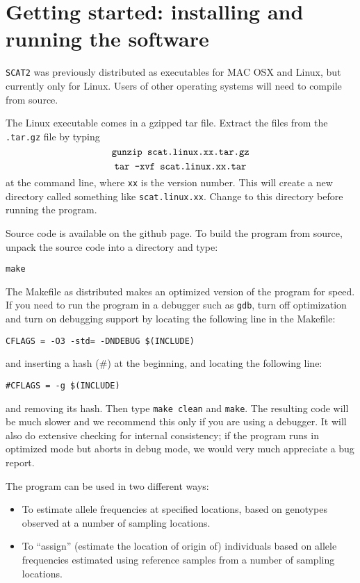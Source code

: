 \documentclass[10pt,titlepage,times,letterpaper]{article}
\def\SCAT{{\tt SCAT2} }
\begin{document}

\section{Getting started: installing and running the software} \label{started}

\SCAT was previously distributed as executables for MAC OSX and
Linux, but currently only for Linux.  Users of other operating systems
will need to compile from source.

The Linux executable comes in a gzipped tar file.
Extract the files from the {\tt .tar.gz} file by typing
$$\text{{\tt gunzip scat.linux.xx.tar.gz}}$$
$$\text{{\tt tar -xvf scat.linux.xx.tar}}$$
at the command line, where {\tt xx} is the version number.
This will create a new directory called something like
{\tt scat.linux.xx}. Change to this directory before
running the program.

Source code is available on the github page. 
To build the program from source, unpack the source code into a directory and type:

{\tt make}

The Makefile as distributed makes an optimized version of the program for speed.
If you need to run the program in a debugger such as {\tt gdb}, turn off optimization 
and turn on debugging support by locating the following line in the Makefile:

\begin{verbatim}
CFLAGS = -O3 -std= -DNDEBUG $(INCLUDE)
\end{verbatim}

and inserting a hash (\#) at the beginning, and locating the following line:

\begin{verbatim}
#CFLAGS = -g $(INCLUDE)
\end{verbatim}

and removing its hash.  Then type {\tt make clean} and {\tt make}.   
The resulting code will be much slower and we recommend this only if you 
are using a debugger.  It will also do extensive checking for internal
consistency; if the program runs in optimized mode but aborts in 
debug mode, we would very much appreciate a bug report.

The program can be used in two different ways:
\begin{itemize}
\item To estimate allele frequencies at specified
locations, based on genotypes observed at a number of sampling
locations.
\item To ``assign'' (estimate the location of origin of)
individuals based on allele
frequencies estimated using reference samples from a number of
sampling locations.
\end{itemize}
\end{document}
